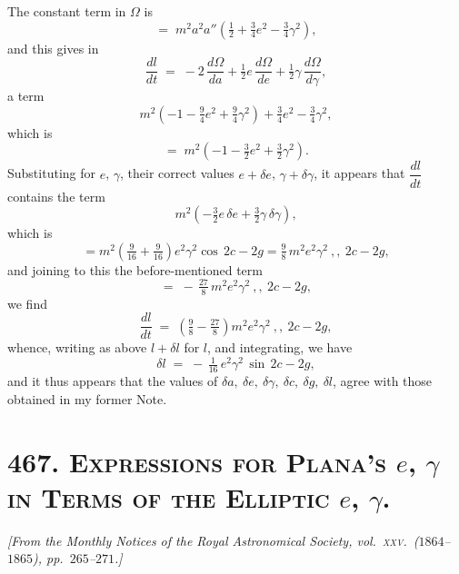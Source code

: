\documentclass[11pt]{article}
\begin{document}
The constant term in $\Omega$ is
\[
=\;m^{2}a^{2}a''(\tfrac{1}{2} + \tfrac{3}{4}e^{2} - \tfrac{3}{4}\gamma^{2}),
\]
and this gives in
\[
\frac{dl}{dt} \;=\; -2\,\frac{d\Omega}{da} + \tfrac{1}{2}e\,\frac{d\Omega}{de}
+ \tfrac{1}{2}\gamma\,\frac{d\Omega}{d\gamma},
\]
a term
\[
m^{2}\!\left(-1 - \tfrac{9}{4}e^{2} + \tfrac{9}{4}\gamma^{2}\right)
+ \tfrac{3}{4}e^{2} - \tfrac{3}{4}\gamma^{2},
\]
which is
\[
=\;m^{2}\!\left(-1 - \tfrac{3}{2}e^{2} + \tfrac{3}{2}\gamma^{2}\right).
\]
Substituting for $e$, $\gamma$, their correct values $e + \delta e$,
$\gamma + \delta \gamma$, it appears that $\dfrac{dl}{dt}$ contains
the term
\[
m^{2}\!\left(-\tfrac{3}{2}e\,\delta e + \tfrac{3}{2}\gamma\,\delta\gamma\right),
\]
which is
\[
= m^{2}\!\left(\tfrac{9}{16} + \tfrac{9}{16}\right)e^{2}\gamma^{2}\cos\,2c - 2g
= \tfrac{9}{8}\,m^{2}e^{2}\gamma^{2}\ ,,\ 2c - 2g,
\]
and joining to this the before-mentioned term
\[
=\;-\,\tfrac{27}{8}\,m^{2}e^{2}\gamma^{2}\ ,,\ 2c - 2g,
\]
we find
\[
\frac{dl}{dt} \;=\; \left(\tfrac{9}{8} - \tfrac{27}{8}\right)m^{2}e^{2}\gamma^{2}\ ,,\ 2c - 2g,
\]
whence, writing as above $l + \delta l$ for $l$, and integrating, we
have
\[
\delta l \;=\; -\,\tfrac{1}{16}\,e^{2}\gamma^{2}\,\sin\,2c - 2g,
\]
and it thus appears that the values of $\delta a,\ \delta e,\ \delta\gamma,\ \delta c,\ \delta g,\ \delta l$,
agree with those obtained in my former Note.

\section*{467. \textsc{Expressions for Plana's $e$, $\gamma$ in Terms of the Elliptic $e$, $\gamma$.}}

\begin{center}
\textit{[From the Monthly Notices of the Royal Astronomical Society,
vol.\ \textsc{xxv}.\ ($1864$--$1865$), pp.\ $265$--$271$.]}
\end{center}

\medskip
\end{document}
